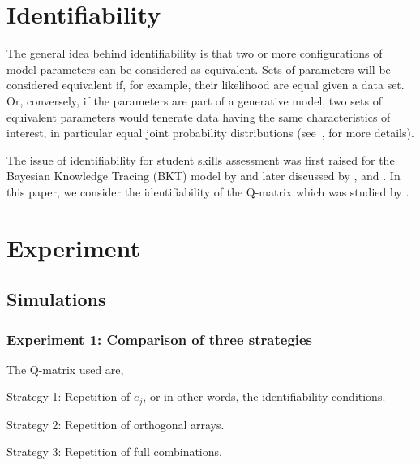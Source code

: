 \documentclass{edm_template-no-copyright}
\begin{document}
\section{Identifiability}

The general idea behind identifiability is that two or more configurations of model parameters can be considered as equivalent.  Sets of parameters will be considered equivalent if, for example, their likelihood are equal given a data set.  Or, conversely, if the parameters are part of a generative model, two sets of equivalent parameters would tenerate data having the same characteristics of interest, in particular equal joint probability distributions (see~, for more details).

The issue of identifiability for student skills assessment was first raised for the Bayesian Knowledge Tracing (BKT) model by  and later discussed by , and .  In this paper, we consider the identifiability of the Q-matrix which was studied by  .  

\section{Experiment}


\subsection{Simulations}


\subsubsection{Experiment 1: Comparison of three strategies}
   
The Q-matrix used are,

Strategy 1: Repetition of $e_j$, or in other words, the identifiability conditions.

Strategy 2: Repetition of orthogonal arrays.

Strategy 3: Repetition of full combinations.
\end{document}
